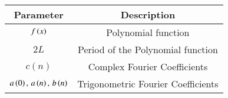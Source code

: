 \begin{tabular}[12pt]{ |c| c|}
    \hline
    \textbf{Parameter} & \textbf{Description}\\ 
    \hline
    $f\left(x\right)$ & Polynomial function\\
    \hline
    $2L$& Period of the Polynomial function\\ 
    \hline
    $c(n)$ & Complex Fourier Coefficients\\
    \hline
     $a\left(0\right),\,a\left(n\right),\,b\left(n\right)$& Trigonometric Fourier Coefficients\\
    \hline   
     \end{tabular}

